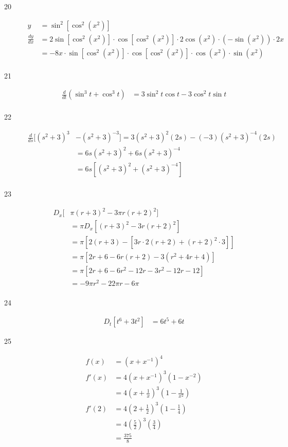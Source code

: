 \documentclass{exam}
\begin{document}
\begin{description}
\item[20]
\begin{align*}
  y &= \sin^2 [ \cos^2 (x^2) ] \\
  \frac{dy}{dx} &= 2 \sin [ \cos^2 (x^2) ] \cdot \cos [ \cos^2 (x^2) ] \cdot 2 \cos (x^2) \cdot (- \sin(x^2)) \cdot 2x \\
   &= -8x \cdot \sin [ \cos^2 (x^2) ] \cdot \cos [ \cos^2 (x^2) ] \cdot \cos (x^2) \cdot \sin(x^2)  \\
\end{align*}

\item[21]
\begin{align*}
  \frac{d}{dt} (\sin^3 t + \cos^3 t) &= 3 \sin^2 t \cos t - 3 \cos^2 t \sin t \\
\end{align*}

\item[22]
\begin{align*}
  \frac{d}{ds} [ (s^2 + 3)^3 &- (s^2 + 3)^{-3} ] = 3 (s^2 + 3)^2(2s) - (-3)(s^2 + 3)^{-4}(2s) \\
    &= 6s (s^2 + 3)^2 + 6s (s^2 + 3)^{-4} \\
    &= 6s [ (s^2 + 3)^2 + (s^2 + 3)^{-4} ] \\
\end{align*}

\item[23]
\begin{align*}
  D_x [ & \pi (r + 3)^2 - 3 \pi r (r + 2)^2 ] \\
    &=  \pi D_x [ (r + 3)^2 - 3 r (r + 2)^2 ] \\
    &= \pi [ 2 (r + 3) - [ 3 r \cdot 2(r + 2) + (r + 2)^2 \cdot 3] ] \\
    &= \pi [ 2r + 6 - 6r(r + 2) - 3(r^2 + 4r + 4)] \\
    &= \pi [ 2r + 6 - 6r^2 - 12r - 3r^2 - 12r - 12] \\
    &= -9 \pi r^2 - 22 \pi r - 6 \pi \\
\end{align*}

\item[24]
\begin{align*}
  D_t [ t^6 + 3t^2 ] &= 6t^5 + 6t
\end{align*}

\item[25]
\begin{align*}
  f(x) &= ( x + x^{-1} )^4 \\
  f'(x) &= 4(x + x^{-1})^3 (1 - x^{-2}) \\
        &= 4 \left(x + \frac{1}{x} \right)^3 \left(1 - \frac{1}{x^2} \right) \\
  f'(2) &= 4 \left(2 + \frac{1}{2} \right)^3 \left(1 - \frac{1}{4} \right) \\
        &= 4 \left(\frac{5}{2} \right)^3 \left(\frac{3}{4} \right) \\
        &= \frac{375}{8}  \\
\end{align*}


\end{description}
\end{document}
